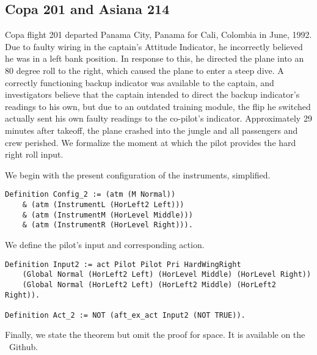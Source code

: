 

\subsection{Copa 201 and Asiana 214}
\noindent
Copa flight 201 departed Panama City, Panama for Cali, Colombia in June, 1992. Due to faulty wiring in the captain's Attitude Indicator, he incorrectly believed he was in a left bank position. In response to this, he directed the plane into an 80 degree roll to the right, which caused the plane to enter a steep dive. A correctly functioning backup indicator was available to the captain, and investigators believe that the captain intended to direct the backup indicator's readings to his own, but due to an outdated training module, the flip he switched actually sent his own faulty readings to the co-pilot's indicator. Approximately 29 minutes after takeoff, the plane crashed into the jungle and all passengers and crew perished. We formalize the moment at which the pilot provides the hard right roll input.

We begin with the present configuration of the instruments, simplified.

\begin{tcolorbox}\begin{lstlisting}[language=Coq]
Definition Config_2 := (atm (M Normal))
	& (atm (InstrumentL (HorLeft2 Left))) 
	& (atm (InstrumentM (HorLevel Middle)))
	& (atm (InstrumentR (HorLevel Right))).
	\end{lstlisting}
\end{tcolorbox}

We define the pilot's input and corresponding action.

\begin{tcolorbox}\begin{lstlisting}[language=Coq]
Definition Input2 := act Pilot Pilot Pri HardWingRight
	(Global Normal (HorLeft2 Left) (HorLevel Middle) (HorLevel Right))
	(Global Normal (HorLeft2 Left) (HorLeft2 Middle) (HorLeft2 Right)).

Definition Act_2 := NOT (aft_ex_act Input2 (NOT TRUE)).
	\end{lstlisting}
\end{tcolorbox}

Finally, we state the theorem but omit the proof for space. It is available on the \DASL\ Github.

